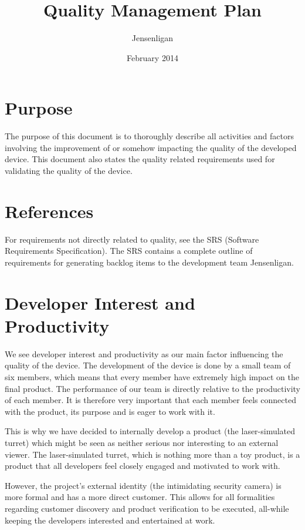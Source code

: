 \documentclass{article}
\title{Quality Management Plan}
\author{Jensenligan}
\date{February 2014}
\begin{document}
\maketitle

\section{Purpose}
The purpose of this document is to thoroughly describe all activities and factors involving the improvement of or somehow impacting the quality of the developed device.
This document also states the quality related requirements used for validating the quality of the device.

\tableofcontents 

\clearpage

\section{References}
For requirements not directly related to quality, see the SRS (Software Requirements Specification).
The SRS contains a complete outline of requirements for generating backlog items to the development team Jensenligan.

\section{Developer Interest and Productivity}
We see developer interest and productivity as our main factor influencing the quality of the device. 
The development of the device is done by a small team of six members, which means that every member have extremely high impact on the final product.
The performance of our team is directly relative to the productivity of each member.
It is therefore very important that each member feels connected with the product, its purpose and is eager to work with it. 

This is why we have decided to internally develop a product (the laser-simulated turret) which might be seen as neither serious nor interesting to an external viewer.
The laser-simulated turret, which is nothing more than a toy product, is a product that all developers feel closely engaged and motivated to work with.

However, the project's external identity (the intimidating security camera) is more formal and has a more direct customer.
This allows for all formalities regarding customer discovery and product verification to be executed, all-while keeping the developers interested and entertained at work.
\end{document}
